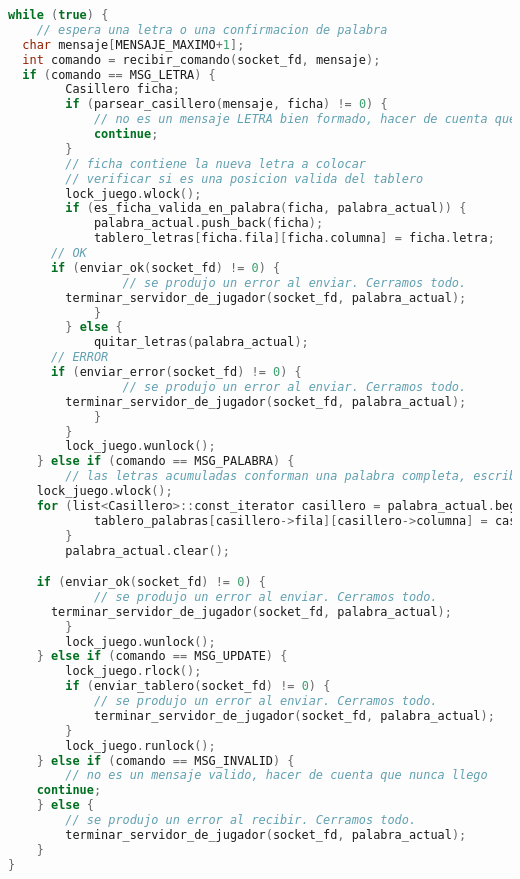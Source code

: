 \begin{lstlisting}[language=C++, breaklines=true]
while (true) {
	// espera una letra o una confirmacion de palabra
  char mensaje[MENSAJE_MAXIMO+1];
  int comando = recibir_comando(socket_fd, mensaje);
  if (comando == MSG_LETRA) {
		Casillero ficha;
		if (parsear_casillero(mensaje, ficha) != 0) {
			// no es un mensaje LETRA bien formado, hacer de cuenta que nunca llego
			continue;
		}
		// ficha contiene la nueva letra a colocar
		// verificar si es una posicion valida del tablero
		lock_juego.wlock();
		if (es_ficha_valida_en_palabra(ficha, palabra_actual)) {
			palabra_actual.push_back(ficha);
			tablero_letras[ficha.fila][ficha.columna] = ficha.letra;
      // OK
      if (enviar_ok(socket_fd) != 0) {
				// se produjo un error al enviar. Cerramos todo.
        terminar_servidor_de_jugador(socket_fd, palabra_actual);
			}
		} else {
			quitar_letras(palabra_actual);
      // ERROR
      if (enviar_error(socket_fd) != 0) {
				// se produjo un error al enviar. Cerramos todo.
        terminar_servidor_de_jugador(socket_fd, palabra_actual);
			}
		}
		lock_juego.wunlock();
	} else if (comando == MSG_PALABRA) {
		// las letras acumuladas conforman una palabra completa, escribirlas en el tablero de palabras y borrar las letras temporales
    lock_juego.wlock();
    for (list<Casillero>::const_iterator casillero = palabra_actual.begin(); casillero != palabra_actual.end(); casillero++) {
			tablero_palabras[casillero->fila][casillero->columna] = casillero->letra;
		}
		palabra_actual.clear();

    if (enviar_ok(socket_fd) != 0) {
			// se produjo un error al enviar. Cerramos todo.
      terminar_servidor_de_jugador(socket_fd, palabra_actual);
		}
		lock_juego.wunlock();
	} else if (comando == MSG_UPDATE) {
		lock_juego.rlock();
		if (enviar_tablero(socket_fd) != 0) {
			// se produjo un error al enviar. Cerramos todo.
			terminar_servidor_de_jugador(socket_fd, palabra_actual);
		}
		lock_juego.runlock();
	} else if (comando == MSG_INVALID) {
		// no es un mensaje valido, hacer de cuenta que nunca llego
    continue;
	} else {
		// se produjo un error al recibir. Cerramos todo.
		terminar_servidor_de_jugador(socket_fd, palabra_actual);
	}
}
\end{lstlisting}